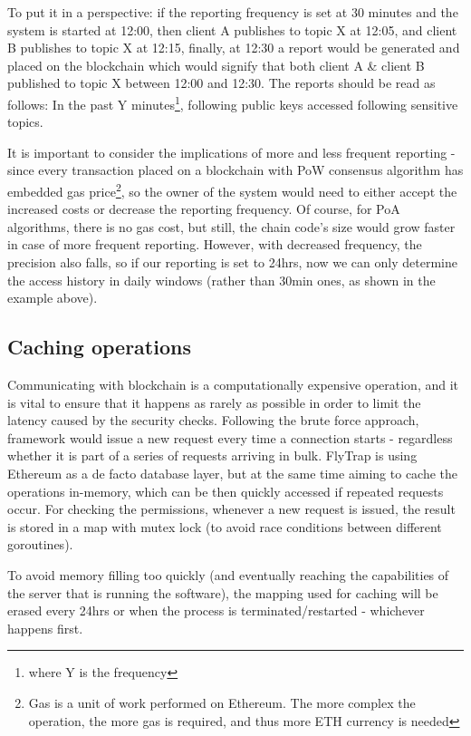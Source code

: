 To put it in a perspective: if the reporting frequency is set at 30 minutes and the system is started at 12:00, then client A publishes to topic  X at 12:05, and client B publishes to topic X at 12:15, finally, at 12:30 a report would be generated and placed on the blockchain which would signify that both client A \& client B published to topic X between 12:00 and 12:30. The reports should be read as follows: In the past Y minutes\footnote{where Y is the frequency}, following public keys accessed following sensitive topics. 

It is important to consider the implications of more and less frequent reporting - since every transaction placed on a blockchain with PoW consensus algorithm has embedded gas price\footnote{Gas is a unit of work performed on Ethereum. The more complex the operation, the more gas is required, and thus more ETH currency is needed}, so the owner of the system would need to either accept the increased costs or decrease the reporting frequency. Of course, for PoA algorithms, there is no gas cost, but still, the chain code's size would grow faster in case of more frequent reporting. However, with decreased frequency, the precision also falls, so if our reporting is set to 24hrs, now we can only determine the access history in daily windows (rather than 30min ones, as shown in the example above).
\subsection{Caching operations}
Communicating with blockchain is a computationally expensive operation, and it is vital to ensure that it happens as rarely as possible in order to limit the latency caused by the security checks. Following the brute force approach, framework would issue a new request every time a connection starts - regardless whether it is part of a series of requests arriving in bulk. FlyTrap is using Ethereum as a de facto database layer, but at the same time aiming to cache the operations in-memory, which can be then quickly accessed if repeated requests occur. For checking the permissions, whenever a new request is issued, the result is stored in a map with mutex lock (to avoid race conditions between different goroutines).

To avoid memory filling too quickly (and eventually reaching the capabilities of the server that is running the software), the mapping used for caching will be erased every 24hrs or when the process is terminated/restarted - whichever happens first.

